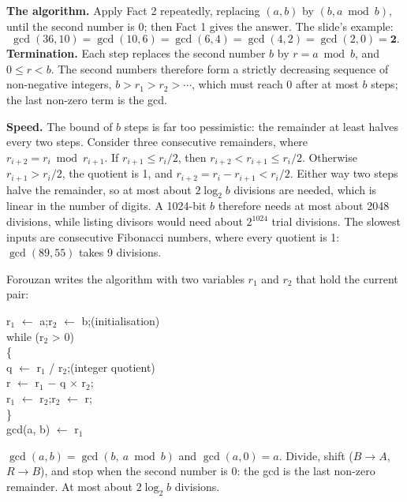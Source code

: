 \textbf{The algorithm.} Apply Fact 2 repeatedly, replacing $(a, b)$ by $(b, a \bmod b)$, until the second number is 0; then Fact 1 gives the answer. The slide's example:
\[
\gcd(36, 10) = \gcd(10, 6) = \gcd(6, 4) = \gcd(4, 2) = \gcd(2, 0) = \mathbf{2}.
\]
\textbf{Termination.} Each step replaces the second number $b$ by $r = a \bmod b$, and $0 \le r < b$. The second numbers therefore form a strictly decreasing sequence of non-negative integers, $b > r_1 > r_2 > \cdots$, which must reach 0 after at most $b$ steps; the last non-zero term is the gcd.

\textbf{Speed.} The bound of $b$ steps is far too pessimistic: the remainder at least halves every two steps. Consider three consecutive remainders, where $r_{i+2} = r_i \bmod r_{i+1}$. If $r_{i+1} \le r_i / 2$, then $r_{i+2} < r_{i+1} \le r_i / 2$. Otherwise $r_{i+1} > r_i / 2$, the quotient is 1, and $r_{i+2} = r_i - r_{i+1} < r_i / 2$. Either way two steps halve the remainder, so at most about $2\log_2 b$ divisions are needed, which is linear in the number of digits. A 1024-bit $b$ therefore needs at most about 2048 divisions, while listing divisors would need about $2^{1024}$ trial divisions. The slowest inputs are consecutive Fibonacci numbers, where every quotient is 1: $\gcd(89, 55)$ takes 9 divisions.

Forouzan writes the algorithm with two variables $r_1$ and $r_2$ that hold the current pair:
\begin{center}
\begin{minipage}{0.55\textwidth}
\small\ttfamily
r$_1$ $\leftarrow$ a;\quad r$_2$ $\leftarrow$ b;\hfill\textrm{(initialisation)}\\
while (r$_2$ > 0)\\
\{\\
\hspace*{1.5em}q $\leftarrow$ r$_1$ / r$_2$;\hfill\textrm{(integer quotient)}\\
\hspace*{1.5em}r $\leftarrow$ r$_1$ $-$ q $\times$ r$_2$;\\
\hspace*{1.5em}r$_1$ $\leftarrow$ r$_2$;\quad r$_2$ $\leftarrow$ r;\\
\}\\
gcd(a, b) $\leftarrow$ r$_1$
\end{minipage}
\end{center}

\begin{mustknow}
$\gcd(a, b) = \gcd(b,\ a \bmod b)$ and $\gcd(a, 0) = a$. Divide, shift ($B \to A$, $R \to B$), and stop when the second number is 0: the gcd is the last non-zero remainder. At most about $2\log_2 b$ divisions.
\end{mustknow}

